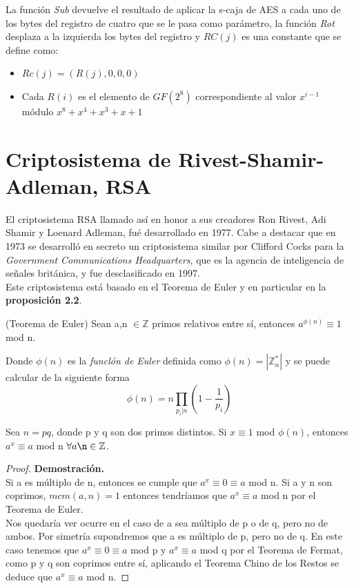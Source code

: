 La función \emph{Sub} devuelve el resultado de aplicar la s-caja de AES a cada uno de los bytes del registro de cuatro que se le pasa como parámetro, la función \emph{Rot} desplaza a la izquierda los bytes del registro y $RC(j)$ es una constante que se define como:
\begin{itemize}
	\item $Rc(j)=(R(j),0,0,0)$
	\item Cada $R(i)$ es el elemento de $GF(2^8)$ correspondiente al valor $x^{i-1}$ módulo $x^8+x^4+x^3+x+1$
\end{itemize}

\section{Criptosistema de Rivest-Shamir-Adleman, RSA}
El criptosistema RSA llamado así en honor a sus creadores Ron Rivest, Adi Shamir y Loenard Adleman, fué desarrollado en 1977. Cabe a destacar que en 1973 se desarrolló en secreto un criptosistema similar por Clifford Cocks para la \emph{Government Communications Headquarters}, que es la agencia de inteligencia de señales británica, y fue desclasificado en 1997\cite{cliffordCocks}.\\
Este criptosistema está basado en el Teorema de Euler y en particular en la \textbf{proposición 2.2}.
\begin{teorema}
	(Teorema de Euler) Sean a,n $\in \mathbb{Z}$ primos relativos entre sí, entonces $a^{\phi(n)}\equiv 1$ mod n.
\end{teorema}
Donde $\phi(n)$ es la \emph{funclón de Euler} definida como $\phi(n)=|\mathbb{Z}^*_n|$ y se puede calcular de la siguiente forma $$\phi(n)=n\prod_{p_i|n}(1-\frac{1}{p_i})$$


\begin{proposicion}
	Sea $n = pq$, donde p y q son dos primos distintos. Si $x\equiv 1$ mod $\phi(n)$, entonces $a^x\equiv a$ mod n $\forall a \n \in \mathbb{Z}$.\\
	\begin{proof}
		\textbf{Demostración.}\\
		Si a es múltiplo de n, entonces se cumple que $a^x \equiv 0 \equiv a$ mod n. Si a y n son coprimos, $mcm(a,n) = 1$ entonces tendríamos que $a^x \equiv a$ mod n por el Teorema de Euler.\\
		Nos quedaría ver ocurre en el caso de a sea múltiplo de p o de q, pero no de ambos. Por simetría supondremos que a es múltiplo de p, pero no de q. En este caso tenemos que $a^x \equiv 0 \equiv a$ mod p  y $a^x \equiv a$ mod q por el Teorema de Fermat, como p y q son coprimos entre sí, aplicando el Teorema Chino de los Restos se deduce que $a^x \equiv a$ mod n. \blacksquare
	\end{proof}
\end{proposicion}
